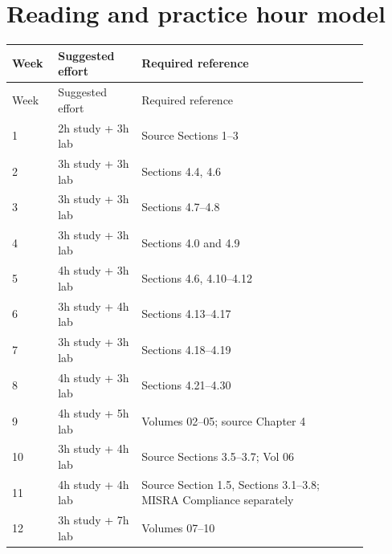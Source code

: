\documentclass[10pt,letterpaper]{article}
\begin{document}
\section{Reading and practice hour model}
\small\setlength{\tabcolsep}{3pt}\renewcommand{\arraystretch}{1.15}
\begin{longtable}{p{0.09\linewidth}p{0.21\linewidth}p{0.58\linewidth}}
\toprule
Week & Suggested effort & Required reference\\ \midrule
\endfirsthead
\toprule
Week & Suggested effort & Required reference\\ \midrule
\endhead
1 & 2h study + 3h lab & Source Sections 1--3\\
2 & 3h study + 3h lab & Sections 4.4, 4.6\\
3 & 3h study + 3h lab & Sections 4.7--4.8\\
4 & 3h study + 3h lab & Sections 4.0 and 4.9\\
5 & 4h study + 3h lab & Sections 4.6, 4.10--4.12\\
6 & 3h study + 4h lab & Sections 4.13--4.17\\
7 & 3h study + 3h lab & Sections 4.18--4.19\\
8 & 4h study + 3h lab & Sections 4.21--4.30\\
9 & 4h study + 5h lab & Volumes 02--05; source Chapter 4\\
10 & 3h study + 4h lab & Source Sections 3.5--3.7; Vol 06\\
11 & 4h study + 4h lab & Source Section 1.5, Sections 3.1--3.8; MISRA Compliance separately\\
12 & 3h study + 7h lab & Volumes 07--10\\
\bottomrule
\end{longtable}
\normalsize
\end{document}
